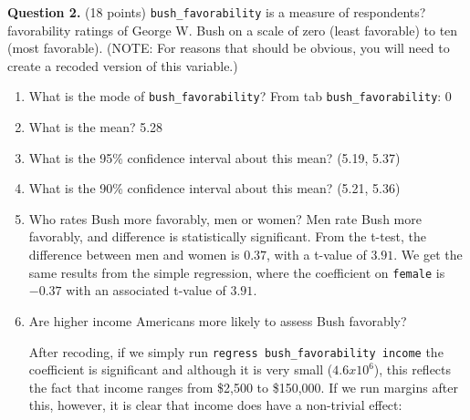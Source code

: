 \documentclass[12pt]{article}
\begin{document}
\vspace{4mm} 
\textbf{Question 2.} \hspace{3mm} (18 points) \verb|bush_favorability| is a measure of respondents? favorability ratings of George W. Bush on a scale of zero (least favorable) to ten (most favorable). (NOTE: For reasons that should be obvious, you will need to create a recoded version of this variable.)
\vspace{4mm} 
\renewcommand{\theenumi}{\alph{enumi}}
\begin{enumerate}
\item What is the mode of \verb|bush_favorability|? From tab \verb|bush_favorability|: 0
\item What is the mean? 5.28
\item What is the 95\% confidence interval about this mean? (5.19, 5.37)
\item What is the 90\% confidence interval about this mean? (5.21, 5.36)
\item Who rates Bush more favorably, men or women? Men rate Bush more favorably, and difference is statistically significant. From the t-test, the difference between men and women is $0.37$, with a t-value of $3.91$. We get the same results from the simple regression, where the coefficient on \verb|female| is $-0.37$ with an associated t-value of $3.91$. 


\item Are higher income Americans more likely to assess Bush favorably?

After recoding, if we simply run \verb|regress bush_favorability income| the coefficient is significant and although it is very small ($4.6x10^6$), this reflects the fact that income ranges from \$2,500 to \$150,000. If we run margins after this, however, it is clear that income does have a non-trivial effect:


\end{enumerate}
\end{document}
